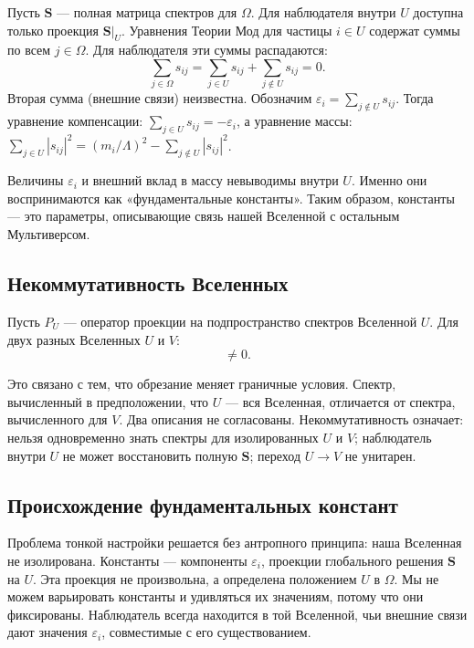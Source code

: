 \documentclass[12pt,a4paper]{article}
\begin{document}
Пусть $\mathbf{S}$ --- полная матрица спектров для $\Omega$. Для наблюдателя внутри $U$ доступна только проекция $\mathbf{S}|_U$. Уравнения Теории Мод для частицы $i \in U$ содержат суммы по всем $j \in \Omega$. Для наблюдателя эти суммы распадаются:
\begin{equation}
    \sum_{j \in \Omega} s_{ij} = \sum_{j \in U} s_{ij} + \sum_{j \notin U} s_{ij} = 0.
\end{equation}
Вторая сумма (внешние связи) неизвестна. Обозначим $\varepsilon_i = \sum_{j \notin U} s_{ij}$. Тогда уравнение компенсации: $\sum_{j \in U} s_{ij} = -\varepsilon_i$, а уравнение массы: $\sum_{j \in U} |s_{ij}|^2 = (m_i/\Lambda)^2 - \sum_{j \notin U} |s_{ij}|^2$.

Величины $\varepsilon_i$ и внешний вклад в массу невыводимы внутри $U$. Именно они воспринимаются как «фундаментальные константы». Таким образом, константы --- это параметры, описывающие связь нашей Вселенной с остальным Мультиверсом.

\subsection{Некоммутативность Вселенных}
Пусть $\hat{P}_U$ --- оператор проекции на подпространство спектров Вселенной $U$. Для двух разных Вселенных $U$ и $V$:
\begin{equation}
    [\hat{P}_U, \hat{P}_V] \neq 0.
\end{equation}

Это связано с тем, что обрезание меняет граничные условия. Спектр, вычисленный в предположении, что $U$ --- вся Вселенная, отличается от спектра, вычисленного для $V$. Два описания не согласованы. Некоммутативность означает: нельзя одновременно знать спектры для изолированных $U$ и $V$; наблюдатель внутри $U$ не может восстановить полную $\mathbf{S}$; переход $U \to V$ не унитарен.

\subsection{Происхождение фундаментальных констант}
Проблема тонкой настройки решается без антропного принципа: наша Вселенная не изолирована. Константы --- компоненты $\varepsilon_i$, проекции глобального решения $\mathbf{S}$ на $U$. Эта проекция не произвольна, а определена положением $U$ в $\Omega$. Мы не можем варьировать константы и удивляться их значениям, потому что они фиксированы. Наблюдатель всегда находится в той Вселенной, чьи внешние связи дают значения $\varepsilon_i$, совместимые с его существованием.
\end{document}
